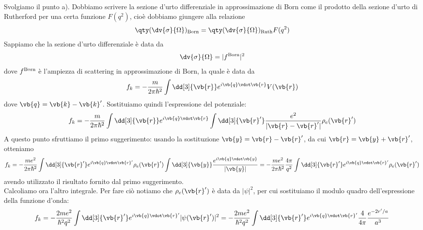 \begin{soluzione}
   Svolgiamo il punto a). Dobbiamo scrivere la sezione d'urto differenziale in approssimazione di Born come il prodotto della sezione d'urto di Rutherford per una certa funzione $F(q^2)$, cioè dobbiamo giungere alla relazione
   \begin{equation*}
      \qty( \dv{\sigma}{\Omega} )_{\rm Born}
      =\qty( \dv{\sigma}{\Omega} )_{\rm Ruth} F(q^2)
   \end{equation*}
   Sappiamo che la sezione d'urto differenziale è data da
   \begin{equation*}
      \dv{\sigma}{\Omega}
      =|f^{\rm Born}|^2
   \end{equation*}
   dove $f^{\rm Born}$ è l'ampiezza di scattering in approssimazione di Born, la quale è data da
   \begin{equation*}
      f_k
      =-\frac{m}{2 \pi \hbar^2} \int \dd[3]{\vb{r}} e^{i \vb{q} \vdot \vb{r}} V(\vb{r})
   \end{equation*}
   dove $\vb{q}=\vb{k} - \vb{k}'$. Sostituiamo quindi l'espressione del potenziale:
   \begin{equation*}
      f_k
      =-\frac{m}{2 \pi \hbar^2} \int \dd[3]{\vb{r}} e^{i \vb{q} \vdot \vb{r}} \int \dd[3]{\vb{r}'} \frac{e^2}{| \vb{r} - \vb{r}' |} \rho_e(\vb{r}')
   \end{equation*}
   A questo punto sfruttiamo il primo suggerimento: usando la sostituzione $\vb{y}=\vb{r} - \vb{r}'$, da cui $\vb{r}=\vb{y} + \vb{r}'$, otteniamo
   \begin{equation*}
      f_k
      =-\frac{m e^2}{2 \pi \hbar^2} \int \dd[3]{\vb{r}'} e^{i \vb{q} \vdot \vb{r}'} \rho_e(\vb{r}') \int \dd[3]{\vb{y}} \frac{e^{i \vb{q} \vdot \vb{y}}}{| \vb{y} |}
      =-\frac{m e^2}{2 \pi \hbar^2} \frac{4 \pi}{q^2} \int \dd[3]{\vb{r}'} e^{i \vb{q} \vdot \vb{r}'} \rho_e(\vb{r}')
   \end{equation*}
   avendo utilizzato il risultato fornito dal primo suggerimento.\\
   Calcoliamo ora l'altro integrale. Per fare ciò notiamo che $\rho_e(\vb{r}')$ è data da $|\psi|^2$, per cui sostituiamo il modulo quadro dell'espressione della funzione d'onda:
   \begin{equation*}
      f_k
      =-\frac{2 m e^2}{\hbar^2 q^2} \int \dd[3]{\vb{r}'} e^{i \vb{q} \vdot \vb{r}'} |\psi(\vb{r}')|^2
      =-\frac{2 m e^2}{\hbar^2 q^2} \int \dd[3]{\vb{r}'} e^{i \vb{q} \vdot \vb{r}'} \frac{4}{4 \pi} \frac{e^{-2 r'/a}}{a^3}
   \end{equation*}

\end{soluzione}
